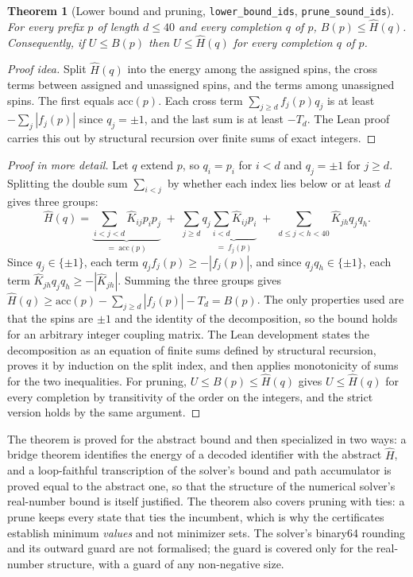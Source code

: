 \documentclass[11pt,a4paper]{article}
\theoremstyle{plain}
\newtheorem{theorem}{Theorem}[section]
\theoremstyle{definition}
\theoremstyle{remark}
\newcommand{\lean}[1]{\nolinkurl{#1}}
\begin{document}
\begin{theorem}[Lower bound and pruning, \lean{lower_bound_ids}, \lean{prune_sound_ids}]\label{thm:bound}
For every prefix $p$ of length $d\le40$ and every completion $q$ of $p$, $B(p)\le\hat H(q)$. Consequently, if $U\le B(p)$ then $U\le\hat H(q)$ for every completion $q$ of $p$.
\end{theorem}
\begin{proof}[Proof idea]
Split $\hat H(q)$ into the energy among the assigned spins, the cross terms between assigned and unassigned spins, and the terms among unassigned spins. The first equals $\mathrm{acc}(p)$. Each cross term $\sum_{j\ge d}f_j(p)q_j$ is at least $-\sum_j|f_j(p)|$ since $q_j=\pm1$, and the last sum is at least $-T_d$. The Lean proof carries this out by structural recursion over finite sums of exact integers.
\end{proof}
\begin{proof}[Proof in more detail]
Let $q$ extend $p$, so $q_i=p_i$ for $i<d$ and $q_j=\pm1$ for $j\ge d$. Splitting the double sum $\sum_{i<j}$ by whether each index lies below or at least $d$ gives three groups:
\[
\hat H(q)=\underbrace{\sum_{i<j<d}\hat K_{ij}p_ip_j}_{=\ \mathrm{acc}(p)}\;+\;\sum_{j\ge d}q_j\underbrace{\sum_{i<d}\hat K_{ij}p_i}_{=\ f_j(p)}\;+\;\sum_{d\le j<h<40}\hat K_{jh}q_jq_h .
\]
Since $q_j\in\{\pm1\}$, each term $q_jf_j(p)\ge-|f_j(p)|$, and since $q_jq_h\in\{\pm1\}$, each term $\hat K_{jh}q_jq_h\ge-|\hat K_{jh}|$. Summing the three groups gives $\hat H(q)\ge\mathrm{acc}(p)-\sum_{j\ge d}|f_j(p)|-T_d=B(p)$. The only properties used are that the spins are $\pm1$ and the identity of the decomposition, so the bound holds for an arbitrary integer coupling matrix. The Lean development states the decomposition as an equation of finite sums defined by structural recursion, proves it by induction on the split index, and then applies monotonicity of sums for the two inequalities. For pruning, $U\le B(p)\le\hat H(q)$ gives $U\le\hat H(q)$ for every completion by transitivity of the order on the integers, and the strict version holds by the same argument.
\end{proof}
The theorem is proved for the abstract bound and then specialized in two ways: a bridge theorem identifies the energy of a decoded identifier with the abstract $\hat H$, and a loop-faithful transcription of the solver's bound and path accumulator is proved equal to the abstract one, so that the structure of the numerical solver's real-number bound is itself justified. The theorem also covers pruning with ties: a prune keeps every state that ties the incumbent, which is why the certificates establish minimum \emph{values} and not minimizer sets. The solver's binary64 rounding and its outward guard are not formalised; the guard is covered only for the real-number structure, with a guard of any non-negative size.
\end{document}
